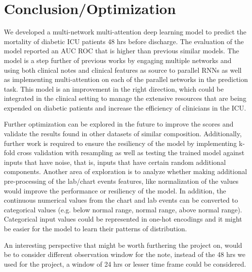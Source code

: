 \documentclass{sigkddExp}
\begin{document}
\section{Conclusion/Optimization}
We developed a multi-network multi-attention deep learning model 
to predict the mortality of diabetic ICU patients 48 hrs before 
discharge. The evaluation of the model reported an AUC ROC that is 
higher than previous similar models. The model is a step further of 
previous works by engaging multiple networks and using both clinical 
notes and clinical features as source to parallel RNNs as well as 
implementing multi-attention on each of the parallel networks in the 
prediction task. This model is an improvement in the right direction, 
which could be integrated in the clinical setting to manage the 
extensive resources that are being expended on diabetic patients 
and increase the efficiency of clinicians in the ICU.

Further optimization can be explored in the future to improve the 
scores and validate the results found in other datasets of similar 
composition. Additionally, further work is required to ensure the 
resiliency of the model by implementing k-fold cross validation with 
resampling as well as testing the trained model against inputs that 
have noise, that is, inputs that have certain random additional components.  
Another area of exploration is to analyze whether making additional 
pre-processing of the lab/chart events features, like normalization 
of the values would improve the performance or resiliency of the model. 
In addition, the continuous numerical values from the chart and lab 
events can be converted to categorical values (e.g. below normal range, 
normal range, above normal range).  Categorical input values could be 
represented in one-hot encodings and it might be easier for the model to 
learn their patterns of distribution.  

An interesting perspective that might be worth furthering the project on, 
would be to consider different observation window for the note, instead of 
the 48 hrs we used for the project, a window of 24 hrs or lesser time 
frame could be considered.
\end{document}
